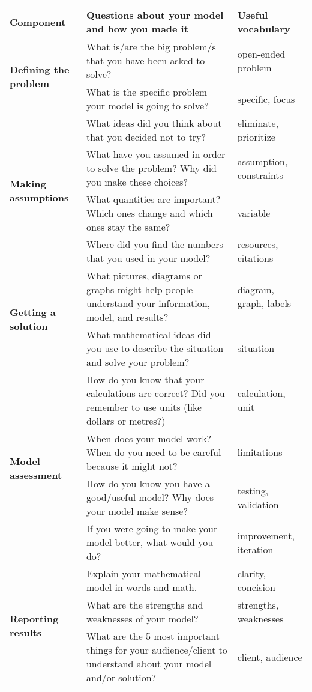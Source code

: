 \begin{siam2019}


\begin{definition}

\begin{tabular}{|p{75pt}|p{200pt}|p{125pt}|}
\hline
\textbf{Component}
	& \textbf{Questions about your model and how you made it}
	& \textbf{Useful vocabulary} \\ \hline
\multirow{2}{75pt}[-10pt]{\textbf{Defining the problem}}
	& What is/are the big problem/s that you have been asked to solve?
		& open-ended problem \\ \cline{2-3}
	& What is the specific problem your model is going to solve?
		& specific, focus \\ \hline
\multirow{4}{75pt}[-25pt]{\textbf{Making assumptions}}
	& What ideas did you think about that you decided not to try? 
		& eliminate, prioritize \\ \cline{2-3}
	& What have you assumed in order to solve the problem? Why did you make these choices? 
		& assumption, constraints \\ \cline{2-3} %
	& What quantities are important? Which ones change and which ones stay the same? 
		& variable  \\ \cline{2-3}
	& Where did you find the numbers that you used in your model? 
		& resources, citations \\ \hline
\multirow{2}{75pt}[-15pt]{\textbf{Getting a solution}}
	& What pictures, diagrams or graphs might help people understand your information, model, and results? 
		& diagram, graph, labels  \\ \cline{2-3}
	& What mathematical ideas did you use to describe the situation and solve your problem? 
		& situation  \\ \hline
\multirow{4}{75pt}[-30pt]{\textbf{Model assessment}}
	& How do you know that your calculations are correct? Did you remember to use units (like dollars or metres?) 
		& calculation, unit \\ \cline{2-3}
	& When does your model work? When do you need to be careful because it might not? 
		& limitations  \\ \cline{2-3}
	& How do you know you have a good/useful model? Why does your model make sense? 
		& testing, validation \\ \cline{2-3}
	& If you were going to make your model better, what would you do? 
		& improvement, iteration \\ \hline
\multirow{3}{75pt}[-20pt]{\textbf{Reporting results}}
	& Explain your mathematical model in words and math. 
		& clarity, concision \\ \cline{2-3}
	& What are the strengths and weaknesses of your model?
		& strengths, weaknesses \\ \cline{2-3}
	& What are the 5 most important things for your audience/client to understand about your model and/or solution? 
		& client, audience \\ \hline
\end{tabular}


\end{definition}
\end{siam2019}
